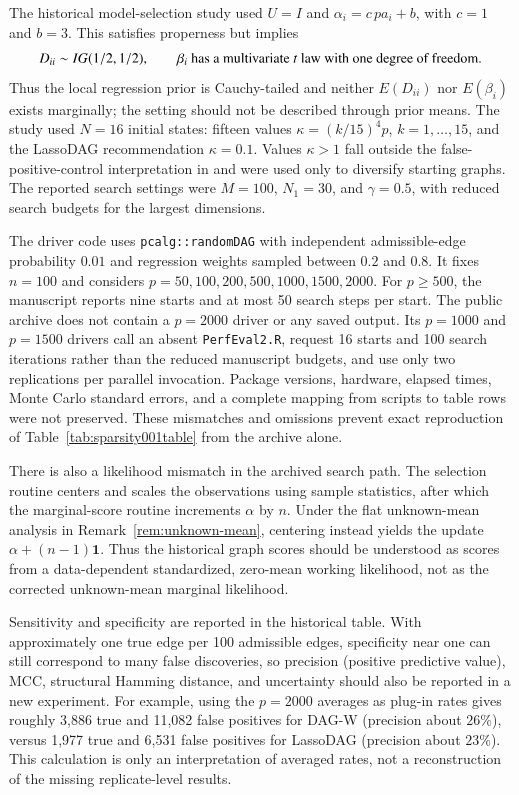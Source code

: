 \documentclass[12pt]{article}
\theoremstyle{plain}
\theoremstyle{definition}
\theoremstyle{remark}
\begin{document}
The historical model-selection study used \(U=I\) and
\(\alpha_i=c\,pa_i+b\), with \(c=1\) and \(b=3\).  This satisfies
properness but implies
\[
D_{ii}\sim IG(1/2,1/2),\qquad
\beta_i\ \hbox{has a multivariate \(t\) law with one degree of freedom}.
\]
Thus the local regression prior is Cauchy-tailed and neither
\(E(D_{ii})\) nor \(E(\beta_i)\) exists marginally; the setting should
not be described through prior means.  The study used \(N=16\) initial
states: fifteen values \(\kappa=(k/15)^4p\), \(k=1,\ldots,15\), and the
LassoDAG recommendation \(\kappa=0.1\).  Values \(\kappa>1\) fall
outside the false-positive-control interpretation in \cite{LassoDAG}
and were used only to diversify starting graphs.  The reported search
settings were \(M=100\), \(N_1=30\), and \(\gamma=0.5\), with reduced
search budgets for the largest dimensions.


The driver code uses \texttt{pcalg::randomDAG} with independent
admissible-edge probability \(0.01\) and regression weights sampled
between \(0.2\) and \(0.8\).  It fixes \(n=100\) and considers
\(p=50,100,200,500,1000,1500,2000\).  For \(p\geq500\), the manuscript
reports nine starts and at most 50 search steps per start.  The public
archive does not contain a \(p=2000\) driver or any saved output.  Its
\(p=1000\) and \(p=1500\) drivers call an absent
\texttt{PerfEval2.R}, request 16 starts and 100 search iterations rather
than the reduced manuscript budgets, and use only two replications per
parallel invocation.  Package versions, hardware, elapsed times, Monte
Carlo standard errors, and a complete mapping from scripts to table rows
were not preserved.  These mismatches and omissions prevent exact reproduction of
Table~\ref{tab:sparsity001table} from the archive alone.

There is also a likelihood mismatch in the archived search path.  The
selection routine centers and scales the observations using sample
statistics, after which the marginal-score routine increments \(\alpha\)
by \(n\).  Under the flat unknown-mean analysis in
Remark~\ref{rem:unknown-mean}, centering instead yields the update
\(\alpha+(n-1)\mathbf1\).  Thus the historical graph scores should be
understood as scores from a data-dependent standardized, zero-mean
working likelihood, not as the corrected unknown-mean marginal
likelihood.

Sensitivity and specificity are reported in the historical table.
With approximately one true edge per 100 admissible edges, specificity
near one can still correspond to many false discoveries, so precision
(positive predictive value), MCC, structural Hamming distance, and
uncertainty should also be reported in a new experiment.  For example,
using the \(p=2000\) averages as plug-in rates gives roughly 3,886 true
and 11,082 false positives for DAG-W (precision about \(26\%\)), versus
1,977 true and 6,531 false positives for LassoDAG (precision about
\(23\%\)).  This calculation is only an interpretation of averaged
rates, not a reconstruction of the missing replicate-level results.
\end{document}
